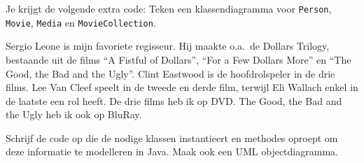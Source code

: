 \documentclass[a4paper,solution]{khltoets}
\begin{document}
\BEGINSOLUTION
{}
\ENDSOLUTION


\clearpage

\BEGINASSIGNMENT
Je krijgt de volgende extra code:
Teken een klassendiagramma voor {\tt Person}, {\tt Movie}, {\tt Media} en {\tt MovieCollection}.
\ENDASSIGNMENT


\BEGINASSIGNMENT
Sergio Leone is mijn favoriete regisseur. Hij maakte o.a.\ de Dollars Trilogy, bestaande uit de films
``A Fistful of Dollars'', ``For a Few Dollars More'' en ``The Good, the Bad and the Ugly''.
Clint Eastwood is de hoofdrolspeler in de drie films. Lee Van Cleef speelt
in de tweede en derde film, terwijl Eli Wallach enkel in de laatste een rol heeft.
De drie films heb ik op DVD. The Good, the Bad and the Ugly heb ik ook op BluRay.

Schrijf de code op die de nodige klassen instantieert en methodes oproept om deze
informatie te modelleren in Java. Maak ook een UML objectdiagramma.
\ENDASSIGNMENT

\BEGINSOLUTION
{}
\ENDSOLUTION
\end{document}
